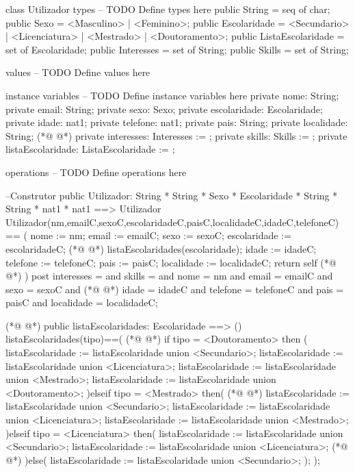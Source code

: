 \begin{vdmpp}[breaklines=true]
class Utilizador
types
-- TODO Define types here
 public String = seq of char;
 public Sexo = <Masculino> | <Feminino>;
 public Escolaridade = <Secundario> | <Licenciatura> | <Mestrado> | <Doutoramento>;
 public ListaEscolaridade = set of Escolaridade;
 public Interesses = set of String;
 public Skills = set of String;
 
values
-- TODO Define values here

instance variables
-- TODO Define instance variables here
 private nome: String;
 private email: String;
 private sexo: Sexo;
 private escolaridade: Escolaridade;
 private idade: nat1;
 private telefone: nat1;
 private pais: String;
 private localidade: String;
(*@
\label{Utilizador:24}
@*)
 private interesses: Interesses := {};
 private skills: Skills := {};
 private listaEscolaridade: ListaEscolaridade := {};
 
operations
-- TODO Define operations here

 --Construtor
 public Utilizador: String * String * Sexo * Escolaridade * String * String * nat1 * nat1 ==> Utilizador
 Utilizador(nm,emailC,sexoC,escolaridadeC,paisC,localidadeC,idadeC,telefoneC) == (
  nome := nm;
  email := emailC;
  sexo := sexoC;
  escolaridade := escolaridadeC;
(*@
\label{addInteresse:38}
@*)
  listaEscolaridades(escolaridade);
  idade := idadeC;
  telefone := telefoneC;
  pais := paisC;
  localidade := localidadeC;
  return self
(*@
\label{removeInteresse:44}
@*)
 )
 post interesses = {} and
   skills = {} and
   nome = nm and
   email = emailC and
   sexo = sexoC and
(*@
\label{getInteresses:50}
@*)
   idade = idadeC and
   telefone = telefoneC and
   pais = paisC and
   localidade = localidadeC;
   
(*@
\label{listaEscolaridades:55}
@*)
 public listaEscolaridades: Escolaridade ==> ()
 listaEscolaridades(tipo)==(
(*@
\label{addSkills:57}
@*)
 if tipo = <Doutoramento> then (
  listaEscolaridade := listaEscolaridade union {<Secundario>};
  listaEscolaridade := listaEscolaridade union {<Licenciatura>};
  listaEscolaridade := listaEscolaridade union {<Mestrado>};
  listaEscolaridade := listaEscolaridade union {<Doutoramento>};
 )elseif tipo = <Mestrado> then(
(*@
\label{removeSkills:63}
@*)
  listaEscolaridade := listaEscolaridade union {<Secundario>};
  listaEscolaridade := listaEscolaridade union {<Licenciatura>};
  listaEscolaridade := listaEscolaridade union {<Mestrado>};
 )elseif tipo = <Licenciatura> then(
  listaEscolaridade := listaEscolaridade union {<Secundario>};
  listaEscolaridade := listaEscolaridade union {<Licenciatura>};
(*@
\label{getSkills:69}
@*)
 )else(
  listaEscolaridade := listaEscolaridade union {<Secundario>};
 );
 );
 

\end{vdmpp}
